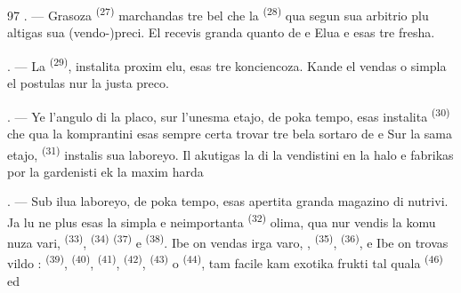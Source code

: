 \begin{VUpage}[99]{97}
. --- Grasoza  \textsuperscript{(27)} marchandas tre\nl
bel  che la  \textsuperscript{(28)} qua segun\nl
sua arbitrio plu altigas sua (vendo-)preci. El\nl
recevis granda quanto de \nl
e  Elua  e  esas tre fresha.

\VUsaut{4.0mm}
\VUsaut{3.0mm}

. --- La  \textsuperscript{(29)}, instalita\nl
proxim elu, esas tre konciencoza. Kande el\nl
vendas  o simpla \nl
el postulas nur la justa preco.

. --- Ye l'angulo di la placo, sur l'unesma\nl
etajo, de poka tempo, esas instalita \cc
{} \textsuperscript{(30)} che qua la komprantini esas sempre\nl
certa trovar tre bela sortaro de \nl
{} e  Sur la sama etajo,\nl
{} \textsuperscript{(31)} instalis sua laboreyo. Il akutigas\nl
la  di la vendistini en la halo e fabrikas\nl
por la gardenisti  ek la maxim harda\nl
{}

\VUsaut{4.0mm}
\VUsaut{3.0mm}

. --- Sub ilua laboreyo, de poka tempo,\nl
esas apertita granda magazino di nutrivi. Ja lu\nl
ne plus esas la simpla e neimportanta \nl
{} \textsuperscript{(32)} olima, qua nur vendis la komu\cc
nuza vari,  \textsuperscript{(33)},  \textsuperscript{(34)}  \textsuperscript{(37)}\nl
e  \textsuperscript{(38)}. Ibe on vendas irga varo, \cc
{},  \textsuperscript{(35)},  \textsuperscript{(36)}, \nl
{} e  Ibe\nl
on trovas vildo :  \textsuperscript{(39)},  \textsuperscript{(40)}, \cc
{} \textsuperscript{(41)},  \textsuperscript{(42)},  \textsuperscript{(43)} o  \textsuperscript{(44)},\nl
tam facile kam exotika frukti tal quala \cc
{} \textsuperscript{(46)} ed 
\end{VUpage}

